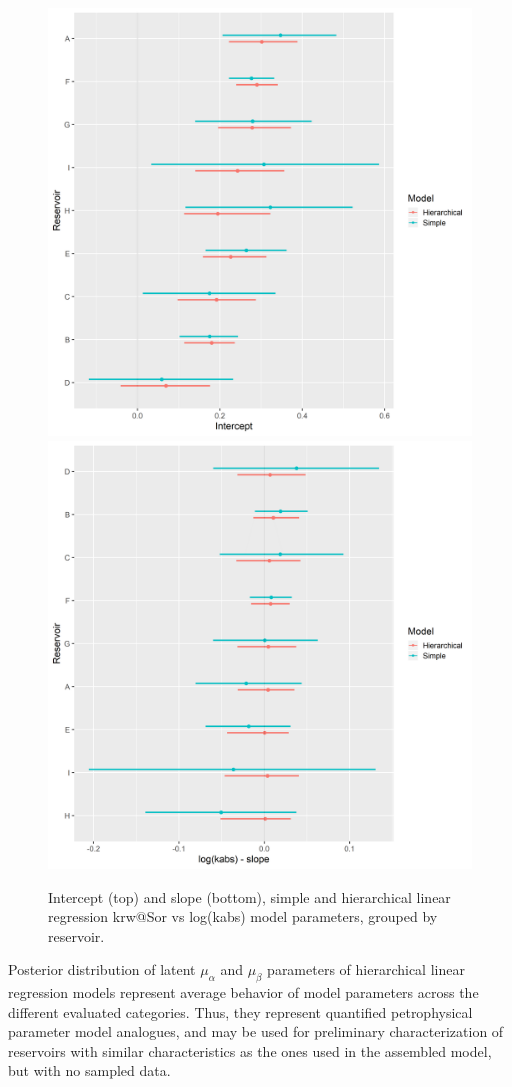 \documentclass[english,msc,numbers]{coppe}
\begin{document}
  \begin{figure}
  
  {\centering \includegraphics[width=0.75\linewidth]{figure/4-15-krw-intercept} \includegraphics[width=0.75\linewidth]{figure/4-15-krw-slopes} 
  
  }
  
  \caption{Intercept (top) and slope (bottom), simple and hierarchical linear regression krw@Sor vs log(kabs) model  parameters, grouped by reservoir.}\label{fig:krw-simple-hierarchical-coefs}
  \end{figure}
  \par
  
  Posterior distribution of latent \(\mu_\alpha\) and \(\mu_\beta\) parameters of hierarchical linear regression models represent average behavior of model parameters across the different evaluated categories. Thus, they represent quantified petrophysical parameter model analogues, and may be used for preliminary characterization of reservoirs with similar characteristics as the ones used in the assembled model, but with no sampled data.
  
\end{document}

